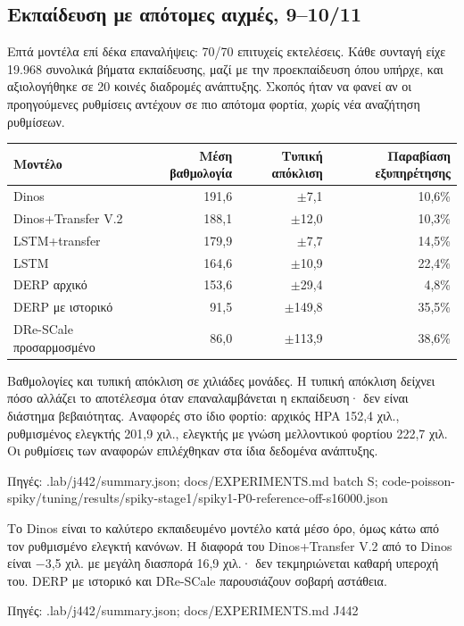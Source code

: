 \documentclass[10pt,a4paper]{article}
\newcommand{\src}[1]{\par{\scriptsize\color{gray}Πηγές: {\ttfamily #1}}\par}
\begin{document}
\subsection*{Εκπαίδευση με απότομες αιχμές, 9--10/11}
Επτά μοντέλα επί δέκα επαναλήψεις: 70/70 επιτυχείς εκτελέσεις. Κάθε συνταγή είχε 19.968 συνολικά βήματα εκπαίδευσης, μαζί με την προεκπαίδευση όπου υπήρχε, και αξιολογήθηκε σε 20 κοινές διαδρομές ανάπτυξης. Σκοπός ήταν να φανεί αν οι προηγούμενες ρυθμίσεις αντέχουν σε πιο απότομα φορτία, χωρίς νέα αναζήτηση ρυθμίσεων.
\begin{center}\begin{tabular}{lrrr}\toprule
Μοντέλο & Μέση βαθμολογία & Τυπική απόκλιση & Παραβίαση εξυπηρέτησης\\\midrule
Dinos & 191,6 & $\pm$7,1 & 10,6\% \\
Dinos+Transfer V.2 & 188,1 & $\pm$12,0 & 10,3\% \\
LSTM+transfer & 179,9 & $\pm$7,7 & 14,5\% \\
LSTM & 164,6 & $\pm$10,9 & 22,4\% \\
DERP αρχικό & 153,6 & $\pm$29,4 & 4,8\% \\
DERP με ιστορικό & 91,5 & $\pm$149,8 & 35,5\% \\
DRe-SCale προσαρμοσμένο & 86,0 & $\pm$113,9 & 38,6\% \\
\bottomrule\end{tabular}\end{center}
Βαθμολογίες και τυπική απόκλιση σε χιλιάδες μονάδες. Η τυπική απόκλιση δείχνει πόσο αλλάζει το αποτέλεσμα όταν επαναλαμβάνεται η εκπαίδευση· δεν είναι διάστημα βεβαιότητας. Αναφορές στο ίδιο φορτίο: αρχικός HPA 152,4 χιλ., ρυθμισμένος ελεγκτής 201,9 χιλ., ελεγκτής με γνώση μελλοντικού φορτίου 222,7 χιλ. Οι ρυθμίσεις των αναφορών επιλέχθηκαν στα ίδια δεδομένα ανάπτυξης.
\src{.lab/\allowbreak j442/\allowbreak summary.json; docs/\allowbreak EXPERIMENTS.md batch S; code-\allowbreak poisson-\allowbreak spiky/\allowbreak tuning/\allowbreak results/\allowbreak spiky-\allowbreak stage1/\allowbreak spiky1-\allowbreak P0-\allowbreak reference-\allowbreak off-\allowbreak s16000.json}
Το Dinos είναι το καλύτερο εκπαιδευμένο μοντέλο κατά μέσο όρο, όμως κάτω από τον ρυθμισμένο ελεγκτή κανόνων. Η διαφορά του Dinos+Transfer V.2 από το Dinos είναι −3,5 χιλ. με μεγάλη διασπορά 16,9 χιλ.· δεν τεκμηριώνεται καθαρή υπεροχή του. DERP με ιστορικό και DRe-SCale παρουσιάζουν σοβαρή αστάθεια.
\src{.lab/\allowbreak j442/\allowbreak summary.json; docs/\allowbreak EXPERIMENTS.md J442}
\end{document}

